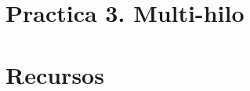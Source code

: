 \documentclass[12pt, twoside, openright]{report} %
\begin{document}
\part{Practica 3. Multi-hilo}



\part{Recursos}




\end{document}
